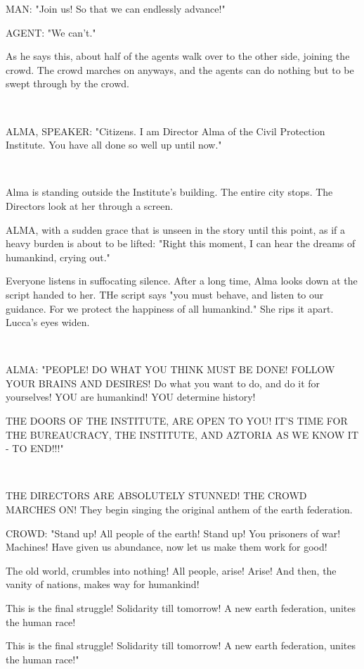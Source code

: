 \documentclass[11pt]{article}
\begin{document}
MAN: "Join us! So that we can endlessly advance!"

AGENT: "We can't."

As he says this, about half of the agents walk over to the other side, joining the crowd.
The crowd marches on anyways, and the agents can do nothing but to be swept through by the crowd. 

\ 

ALMA, SPEAKER: "Citizens. I am Director Alma of the Civil Protection Institute.
You have all done so well up until now."

\ 

Alma is standing outside the Institute's building.
The entire city stops.
The Directors look at her through a screen.

ALMA, with a sudden grace that is unseen in the story until this point, as if a heavy burden is about to be lifted: "Right this moment, I can hear the dreams of humankind, crying out."

Everyone listens in suffocating silence.
After a long time, Alma looks down at the script handed to her.
THe script says "you must behave, and listen to our guidance. 
For we protect the happiness of all humankind."
She rips it apart.
Lucca's eyes widen.

\ 

ALMA: "PEOPLE! 
DO WHAT YOU THINK MUST BE DONE!
FOLLOW YOUR BRAINS AND DESIRES!
Do what you want to do, and do it for yourselves!
YOU are humankind! 
YOU determine history!

THE DOORS OF THE INSTITUTE, ARE OPEN TO YOU!
IT'S TIME FOR THE BUREAUCRACY, THE INSTITUTE, AND AZTORIA AS WE KNOW IT - TO END!!!"

\ 

THE DIRECTORS ARE ABSOLUTELY STUNNED! THE CROWD MARCHES ON! 
They begin singing the original anthem of the earth federation.

CROWD: "Stand up! All people of the earth! 
Stand up! You prisoners of war!
Machines! Have given us abundance,
now let us make them work for good! 

The old world, crumbles into nothing! 
All people, arise! Arise! 
And then, the vanity of nations,
makes way for humankind!

This is the final struggle! 
Solidarity till tomorrow!
A new earth federation,
unites the human race! 

This is the final struggle!
Solidarity till tomorrow!
A new earth federation,
unites the human race!"

\ 
\end{document}

